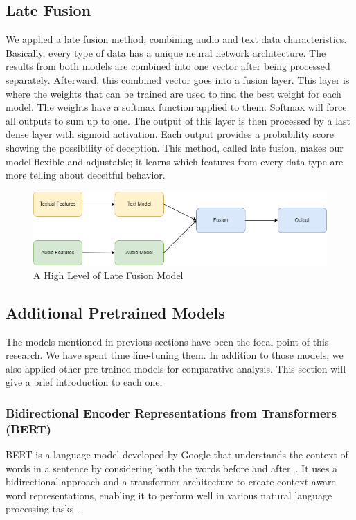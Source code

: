 \documentclass[12pt]{article}
\begin{document}
\subsection{Late Fusion}
We applied a late fusion method, combining audio and text data characteristics. Basically, every type of data has a unique neural network architecture. The results from both models are combined into one vector after being processed separately. Afterward, this combined vector goes into a fusion layer. This layer is where the weights that can be trained are used to find the best weight for each model. The weights have a softmax function applied to them. Softmax will force all outputs to sum up to one. The output of this layer is then processed by a last dense layer with sigmoid activation. Each output provides a probability score showing the possibility of deception. This method, called late fusion, makes our model flexible and adjustable; it learns which features from every data type are more telling about deceitful behavior. 
\begin{figure}[H]
    \centering
    \includegraphics[width=1\linewidth]{High Level Late fusion .drawio.png}
    \caption{A High Level of Late Fusion Model }
    \label{fig:latefusion}
\end{figure}

\subsection{Additional Pretrained Models}
The models mentioned in previous sections have been the focal point of this research. We have spent time fine-tuning them. In addition to those models, we also applied other pre-trained models for comparative analysis. This section will give a brief introduction to each one.
\subsubsection{Bidirectional Encoder Representations from
Transformers (BERT)}
BERT is a language model developed by Google that understands the context of words in a sentence by considering both the words before and after~\cite{devlin2018bert}. It uses a bidirectional approach and a transformer architecture to create context-aware word representations, enabling it to perform well in various natural language processing tasks~\cite{devlin2018bert}.
\end{document}
